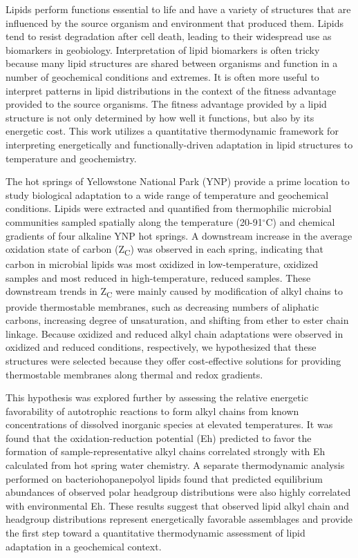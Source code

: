 Lipids perform functions essential to life and have a variety of structures that are influenced by the source organism and environment that produced them. Lipids tend to resist degradation after cell death, leading to their widespread use as biomarkers in geobiology. Interpretation of lipid biomarkers is often tricky because many lipid structures are shared between organisms and function in a number of geochemical conditions and extremes. It is often more useful to interpret patterns in lipid distributions in the context of the fitness advantage provided to the source organisms. The fitness advantage provided by a lipid structure is not only determined by how well it functions, but also by its energetic cost. This work utilizes a quantitative thermodynamic framework for interpreting energetically and functionally-driven adaptation in lipid structures to temperature and geochemistry.

The hot springs of Yellowstone National Park (YNP) provide a prime location to study biological adaptation to a wide range of temperature and geochemical conditions. Lipids were extracted and quantified from thermophilic microbial communities sampled spatially along the temperature (20-91$^{\circ}$C) and chemical gradients of four alkaline YNP hot springs. A downstream increase in the average oxidation state of carbon (Z\textsubscript{C}) was observed in each spring, indicating that carbon in microbial lipids was most oxidized in low-temperature, oxidized samples and most reduced in high-temperature, reduced samples. These downstream trends in Z\textsubscript{C} were mainly caused by modification of alkyl chains to provide thermostable membranes, such as decreasing numbers of aliphatic carbons, increasing degree of unsaturation, and shifting from ether to ester chain linkage. Because oxidized and reduced alkyl chain adaptations were observed in oxidized and reduced conditions, respectively, we hypothesized that these structures were selected because they offer cost-effective solutions for providing thermostable membranes along thermal and redox gradients.

This hypothesis was explored further by assessing the relative energetic favorability of autotrophic reactions to form alkyl chains from known concentrations of dissolved inorganic species at elevated temperatures. It was found that the oxidation-reduction potential (Eh) predicted to favor the formation of sample-representative alkyl chains correlated strongly with Eh calculated from hot spring water chemistry. A separate thermodynamic analysis performed on bacteriohopanepolyol lipids found that predicted equilibrium abundances of observed polar headgroup distributions were also highly correlated with environmental Eh. These results suggest that observed lipid alkyl chain and headgroup distributions represent energetically favorable assemblages and provide the first step toward a quantitative thermodynamic assessment of lipid adaptation in a geochemical context.